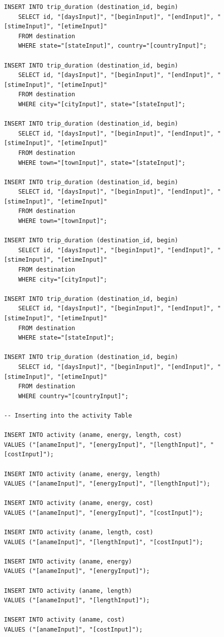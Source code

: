 \documentclass[letterpaper,10pt,onecolumn,compsoc]{IEEEtran}
\begin{document}
\begin{verbatim}
INSERT INTO trip_duration (destination_id, begin) 
	SELECT id, "[daysInput]", "[beginInput]", "[endInput]", "[stimeInput]", "[etimeInput]" 
	FROM destination 
	WHERE state="[stateInput]", country="[countryInput]";
	
INSERT INTO trip_duration (destination_id, begin) 
	SELECT id, "[daysInput]", "[beginInput]", "[endInput]", "[stimeInput]", "[etimeInput]" 
	FROM destination 
	WHERE city="[cityInput]", state="[stateInput]";
	
INSERT INTO trip_duration (destination_id, begin) 
	SELECT id, "[daysInput]", "[beginInput]", "[endInput]", "[stimeInput]", "[etimeInput]" 
	FROM destination 
	WHERE town="[townInput]", state="[stateInput]";
	
INSERT INTO trip_duration (destination_id, begin) 
	SELECT id, "[daysInput]", "[beginInput]", "[endInput]", "[stimeInput]", "[etimeInput]" 
	FROM destination 
	WHERE town="[townInput]";
	
INSERT INTO trip_duration (destination_id, begin) 
	SELECT id, "[daysInput]", "[beginInput]", "[endInput]", "[stimeInput]", "[etimeInput]" 
	FROM destination 
	WHERE city="[cityInput]";
	
INSERT INTO trip_duration (destination_id, begin) 
	SELECT id, "[daysInput]", "[beginInput]", "[endInput]", "[stimeInput]", "[etimeInput]" 
	FROM destination 
	WHERE state="[stateInput]";
	
INSERT INTO trip_duration (destination_id, begin) 
	SELECT id, "[daysInput]", "[beginInput]", "[endInput]", "[stimeInput]", "[etimeInput]" 
	FROM destination 
	WHERE country="[countryInput]";

-- Inserting into the activity Table

INSERT INTO activity (aname, energy, length, cost) 
VALUES ("[anameInput]", "[energyInput]", "[lengthInput]", "[costInput]");

INSERT INTO activity (aname, energy, length) 
VALUES ("[anameInput]", "[energyInput]", "[lengthInput]");

INSERT INTO activity (aname, energy, cost) 
VALUES ("[anameInput]", "[energyInput]", "[costInput]");

INSERT INTO activity (aname, length, cost) 
VALUES ("[anameInput]", "[lengthInput]", "[costInput]");

INSERT INTO activity (aname, energy) 
VALUES ("[anameInput]", "[energyInput]");

INSERT INTO activity (aname, length) 
VALUES ("[anameInput]", "[lengthInput]");

INSERT INTO activity (aname, cost) 
VALUES ("[anameInput]", "[costInput]");
\end{verbatim}
\end{document}
